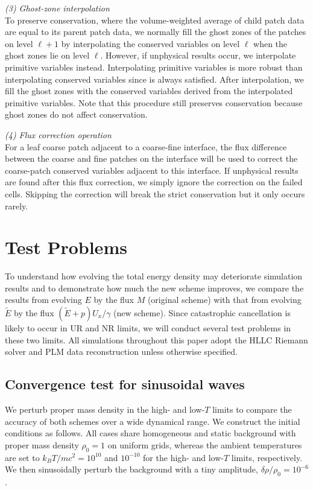 \documentclass[twocolumn]{aastex63}
\begin{document}
\emph{(3) Ghost-zone interpolation}\\
To preserve conservation, where the volume-weighted average of child patch data are equal to its parent patch data, we normally fill the ghost zones of the patches on level $\ell+1$ by interpolating the conserved variables on level $\ell$ when the ghost zones lie on level $\ell$. However, if unphysical results occur, we interpolate primitive variables instead. Interpolating primitive variables is more robust than interpolating conserved variables since  is always satisfied. After interpolation, we fill the ghost zones with the conserved variables derived from the interpolated primitive variables. Note that this procedure still preserves conservation because ghost zones do not affect conservation.

\emph{(4) Flux correction operation}\\
For a leaf coarse patch adjacent to a coarse-fine interface, the flux difference between the coarse and fine patches on the interface will be used to correct the coarse-patch conserved variables adjacent to this interface. If unphysical results are found after this flux correction, we simply ignore the correction on the failed cells. Skipping the correction will break the strict conservation but it only occurs rarely.


\section{Test Problems}
\label{Test Problems}
To understand how evolving the total energy density may deteriorate simulation results and to demonstrate how much the new scheme improves, we compare the results from evolving $E$ by the flux $M$ (original scheme) with that from evolving $\tilde{E}$ by the flux $(\tilde{E}+p)U_{x}/\gamma$ (new scheme). Since catastrophic cancellation is likely to occur in UR and NR limits, we will conduct several test problems in these two limits. All simulations throughout this paper adopt the HLLC Riemann solver and PLM data reconstruction unless otherwise specified.

\subsection{Convergence test for sinusoidal waves}
\label{section:convergence test}
We perturb proper mass density in the high- and low-$T$ limits to compare the accuracy of both schemes over a wide dynamical range. We construct the initial conditions as follows. All cases share homogeneous and static background with proper mass density $\rho_{0}=1$ on uniform grids, whereas the ambient temperatures are set to $k_{B}T/mc^2=10^{10}$ and $10^{-10}$ for the high- and low-$T$ limits, respectively. We then sinusoidally perturb the background with a tiny amplitude, $\delta \rho/\rho_{0}=10^{-6}$.
\end{document}
